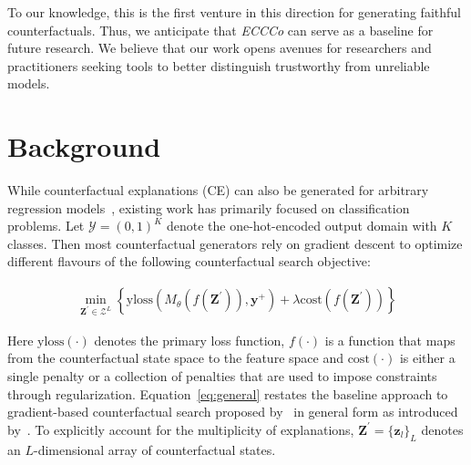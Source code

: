 \documentclass[letterpaper]{article} %
\begin{document}
To our knowledge, this is the first venture in this direction for generating faithful counterfactuals. Thus, we anticipate that \textit{ECCCo} can serve as a baseline for future research. We believe that our work opens avenues for researchers and practitioners seeking tools to better distinguish trustworthy from unreliable models.

\section{Background}\label{background}

While counterfactual explanations (CE) can also be generated for arbitrary regression models~\citep{spooner2021counterfactual}, existing work has primarily focused on classification problems. Let $\mathcal{Y}=(0,1)^K$ denote the one-hot-encoded output domain with $K$ classes. Then most counterfactual generators rely on gradient descent to optimize different flavours of the following counterfactual search objective:

\begin{equation} \label{eq:general}
\begin{aligned}
\min_{\mathbf{Z}^\prime \in \mathcal{Z}^L} \left\{  {\text{yloss}(M_{\theta}(f(\mathbf{Z}^\prime)),\mathbf{y}^+)}+ \lambda {\text{cost}(f(\mathbf{Z}^\prime)) }  \right\} 
\end{aligned} 
\end{equation}

Here $\text{yloss}(\cdot)$ denotes the primary loss function, $f(\cdot)$ is a function that maps from the counterfactual state space to the feature space and $\text{cost}(\cdot)$ is either a single penalty or a collection of penalties that are used to impose constraints through regularization. Equation~\ref{eq:general} restates the baseline approach to gradient-based counterfactual search proposed by~\citet{wachter2017counterfactual} in general form as introduced by~\citet{altmeyer2023endogenous}. To explicitly account for the multiplicity of explanations, $\mathbf{Z}^\prime=\{ \mathbf{z}_l\}_L$ denotes an $L$-dimensional array of counterfactual states. 
\end{document}
